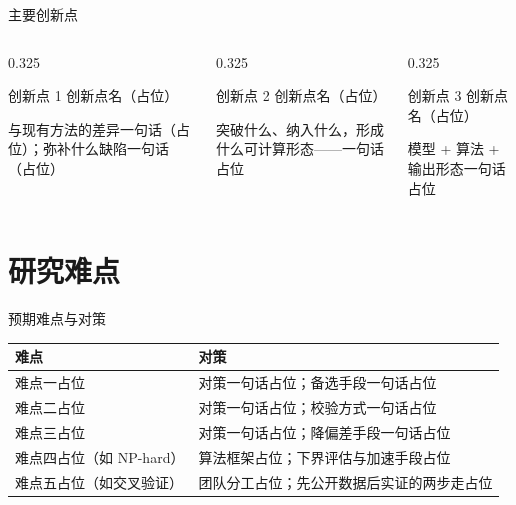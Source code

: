 \documentclass[aspectratio=169,11pt]{beamer}
\begin{document}
\begin{frame}{主要创新点}
  \footnotesize
  \begin{columns}[T]
    \begin{column}{0.325\textwidth}
      \begin{dmucard}{创新点 1}
        \textcolor{dmuhead}{创新点名（占位）}

        \vskip1mm
        与现有方法的差异一句话（占位）；弥补什么缺陷一句话（占位）
      \end{dmucard}
    \end{column}
    \begin{column}{0.325\textwidth}
      \begin{dmucard}{创新点 2}
        \textcolor{dmuhead}{创新点名（占位）}

        \vskip1mm
        突破什么、纳入什么，形成什么可计算形态——一句话占位
      \end{dmucard}
    \end{column}
    \begin{column}{0.325\textwidth}
      \begin{dmucard}{创新点 3}
        \textcolor{dmuhead}{创新点名（占位）}

        \vskip1mm
        模型 + 算法 + 输出形态一句话占位
      \end{dmucard}
    \end{column}
  \end{columns}
\end{frame}

\section{研究难点}

\begin{frame}{预期难点与对策}
  \footnotesize
  \begin{tabular}{@{}p{}@{\quad}p{}@{}}
    \toprule
    \textcolor{dmuhead}{\textbf{难点}} & \textcolor{dmuhead}{\textbf{对策}} \\
    \midrule
    难点一占位 & 对策一句话占位；备选手段一句话占位 \\
    \addlinespace[0.7mm]
    难点二占位 & 对策一句话占位；校验方式一句话占位 \\
    \addlinespace[0.7mm]
    难点三占位 & 对策一句话占位；降偏差手段一句话占位 \\
    \addlinespace[0.7mm]
    难点四占位（如 NP-hard） & 算法框架占位；下界评估与加速手段占位 \\
    \addlinespace[1.2mm]
    难点五占位（如交叉验证） & 团队分工占位；先公开数据后实证的两步走占位 \\
    \bottomrule
  \end{tabular}
\end{frame}
\end{document}
